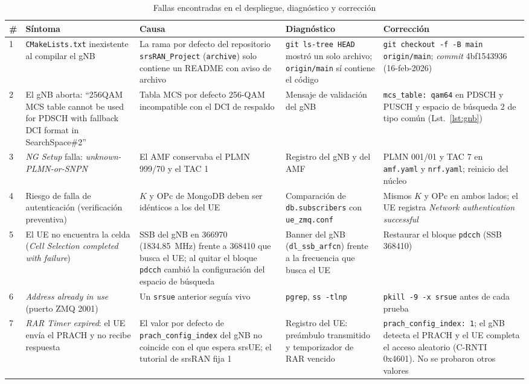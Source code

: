 \documentclass[conference]{IEEEtran}
\begin{document}
\begin{table}[!t]
\caption{Fallas encontradas en el despliegue, diagnóstico y corrección}
\label{tab:fallas}
\centering
\footnotesize
\renewcommand{\arraystretch}{1.15}
\begin{tabular}{p{0.5cm}p{3.5cm}p{4.2cm}p{4.3cm}p{4.4cm}}
\toprule
\textbf{\#} & \textbf{Síntoma} & \textbf{Causa} & \textbf{Diagnóstico} & \textbf{Corrección} \\
\midrule
1 & \texttt{CMakeLists.txt} inexistente al compilar el gNB & La rama por defecto del repositorio \texttt{srsRAN\_Project} (\texttt{archive}) solo contiene un README con aviso de archivo & \texttt{git ls-tree HEAD} mostró un solo archivo; \texttt{origin/main} sí contiene el código & \texttt{git checkout -f -B main origin/main}; \textit{commit} 4bf1543936 (16-feb-2026) \\
2 & El gNB aborta: ``256QAM MCS table cannot be used for PDSCH with fallback DCI format in SearchSpace\#2'' & Tabla MCS por defecto 256-QAM incompatible con el DCI de respaldo & Mensaje de validación del gNB & \texttt{mcs\_table: qam64} en PDSCH y PUSCH y espacio de búsqueda 2 de tipo común (Lst.~\ref{lst:gnb}) \\
3 & \textit{NG Setup} falla: \textit{unknown-PLMN-or-SNPN} & El AMF conservaba el PLMN 999/70 y el TAC 1 & Registro del gNB y del AMF & PLMN 001/01 y TAC 7 en \texttt{amf.yaml} y \texttt{nrf.yaml}; reinicio del núcleo \\
4 & Riesgo de falla de autenticación (verificación preventiva) & $K$ y OPc de MongoDB deben ser idénticos a los del UE & Comparación de \texttt{db.subscribers} con \texttt{ue\_zmq.conf} & Mismos $K$ y OPc en ambos lados; el UE registra \textit{Network authentication successful} \\
5 & El UE no encuentra la celda (\textit{Cell Selection completed with failure}) & SSB del gNB en 366970 (1834.85~MHz) frente a 368410 que busca el UE; al quitar el bloque \texttt{pdcch} cambió la configuración del espacio de búsqueda & Banner del gNB (\texttt{dl\_ssb\_arfcn}) frente a la frecuencia que busca el UE & Restaurar el bloque \texttt{pdcch} (SSB 368410) \\
6 & \textit{Address already in use} (puerto ZMQ 2001) & Un \texttt{srsue} anterior seguía vivo & \texttt{pgrep}, \texttt{ss -tlnp} & \texttt{pkill -9 -x srsue} antes de cada prueba \\
7 & \textit{RAR Timer expired}: el UE envía el PRACH y no recibe respuesta & El valor por defecto de \texttt{prach\_config\_index} del gNB no coincide con el que espera srsUE; el tutorial de srsRAN fija 1 \cite{srsuetut} & Registro del UE: preámbulo transmitido y temporizador de RAR vencido & \texttt{prach\_config\_index: 1}; el gNB detecta el PRACH y el UE completa el acceso aleatorio (C-RNTI 0x4601). No se probaron otros valores \\

\end{tabular}
\end{table}
\end{document}
